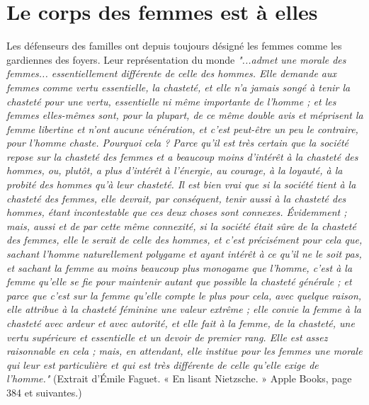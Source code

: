  \section{Le corps des femmes est à elles}


 Les défenseurs des familles ont depuis toujours désigné les femmes comme les gardiennes des foyers. Leur représentation du monde \emph{"...admet une morale des femmes... essentiellement différente de celle des hommes. Elle demande aux femmes comme vertu essentielle, la chasteté, et elle n’a jamais songé à tenir la chasteté pour une vertu, essentielle ni même importante de l’homme ; et les femmes elles-mêmes sont, pour la plupart, de ce même double avis et méprisent la femme libertine et n’ont aucune vénération, et c’est peut-être un peu le contraire, pour l’homme chaste. Pourquoi cela ? Parce qu’il est très certain que la société repose sur la chasteté des femmes et a beaucoup moins d’intérêt à la chasteté des hommes, ou, plutôt, a plus d’intérêt à l’énergie, au courage, à la loyauté, à la probité des hommes qu’à leur chasteté. Il est bien vrai que si la société tient à la chasteté des femmes, elle devrait, par conséquent, tenir aussi à la chasteté des hommes, étant incontestable que ces deux choses sont connexes. Évidemment ; mais, aussi et de par cette même connexité, si la société était sûre de la chasteté des femmes, elle le serait de celle des hommes, et c’est précisément pour cela que, sachant l’homme naturellement polygame et ayant intérêt à ce qu’il ne le soit pas, et sachant la femme au moins beaucoup plus monogame que l’homme, c’est à la femme qu’elle se fie pour maintenir autant que possible la chasteté générale ; et parce que c’est sur la femme qu’elle compte le plus pour cela, avec quelque raison, elle attribue à la chasteté féminine une valeur extrême ; elle convie la femme à la chasteté avec ardeur et avec autorité, et elle fait à la femme, de la chasteté, une vertu supérieure et essentielle et un devoir de premier rang. Elle est assez raisonnable en cela ; mais, en attendant, elle institue pour les femmes une morale qui leur est particulière et qui est très différente de celle qu’elle exige de l’homme."} (Extrait d'Émile Faguet. « En lisant Nietzsche. » Apple Books, page 384 et suivantes.) 
 
